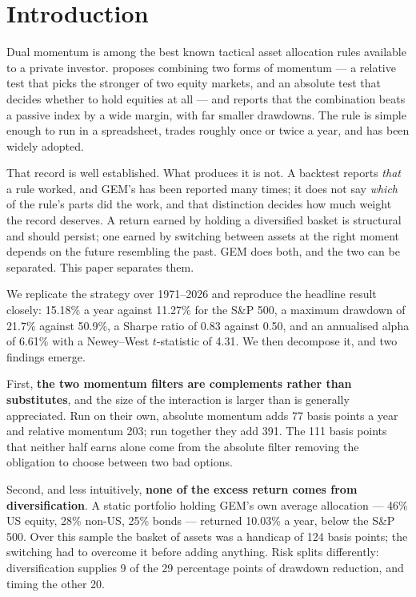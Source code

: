 \documentclass[11pt,a4paper]{article}
\begin{document}
\newpage
\setcounter{page}{2}

\section{Introduction}

Dual momentum is among the best known tactical asset allocation rules available
to a private investor. \citet{antonacci2016} proposes combining two forms of
momentum --- a relative test that picks the stronger of two equity markets, and
an absolute test that decides whether to hold equities at all --- and reports
that the combination beats a passive index by a wide margin, with far smaller
drawdowns. The rule is simple enough to run in a spreadsheet, trades roughly
once or twice a year, and has been widely adopted.

That record is well established. What produces it is not. A backtest reports
\emph{that} a rule worked, and GEM's has been reported many times; it does not
say \emph{which} of the rule's parts did the work, and that distinction decides
how much weight the record deserves. A return earned by holding a diversified
basket is structural and should persist; one earned by switching between assets
at the right moment depends on the future resembling the past. GEM does both,
and the two can be separated. This paper separates them.

We replicate the strategy over 1971--2026 and reproduce the headline result
closely: 15.18\% a year against 11.27\% for the S\&P 500, a maximum drawdown of
21.7\% against 50.9\%, a Sharpe ratio of 0.83 against 0.50, and an annualised
alpha of 6.61\% with a Newey--West $t$-statistic of 4.31. We then decompose it,
and two findings emerge.

First, \textbf{the two momentum filters are complements rather than
substitutes}, and the size of the interaction is larger than is generally
appreciated. Run on their own, absolute momentum adds 77 basis points a year
and relative momentum 203; run together they add 391. The 111 basis points that
neither half earns alone come from the absolute filter removing the obligation
to choose between two bad options.

Second, and less intuitively, \textbf{none of the excess return comes from
diversification}. A static portfolio holding GEM's own average allocation ---
46\% US equity, 28\% non-US, 25\% bonds --- returned 10.03\% a year, below the
S\&P 500. Over this sample the basket of assets was a handicap of 124 basis
points; the switching had to overcome it before adding anything. Risk splits
differently: diversification supplies 9 of the 29 percentage points of drawdown
reduction, and timing the other 20.
\end{document}

